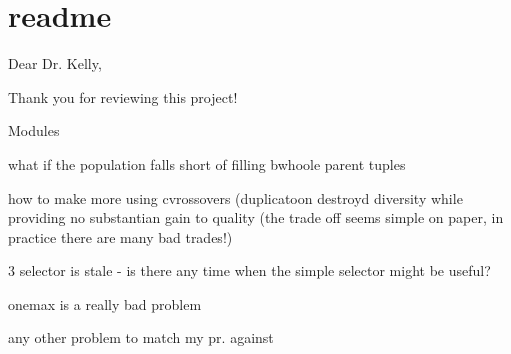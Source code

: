 \chapter{readme}
\hypertarget{md_src_2readme}{}\label{md_src_2readme}
Dear Dr. Kelly,

Thank you for reviewing this project!

Modules

what if the population falls short of filling bwhoole parent tuples


\begin{DoxyEnumerate}
\item how to make more using cvrossovers (duplicatoon destroyd diversity while providing no substantian gain to quality (the trade off seems simple on paper, in practice there are many bad trades!)
\end{DoxyEnumerate}

3 selector is stale -\/ is there any time when the simple selector might be useful?

onemax is a really bad problem

any other problem to match my pr. against 